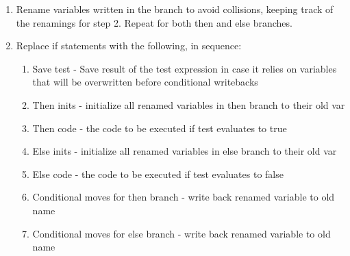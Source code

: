 \documentclass[sigplan, review]{acmart}
\begin{document}
\begin{enumerate}
   \item Rename variables written in the branch to avoid collisions, keeping track of the renamings for step 2. Repeat for both then and else branches.
   \item Replace if statements with the following, in sequence:
   \begin{enumerate}
       \item Save test - Save result of the test expression in case it relies on variables that will be overwritten before conditional writebacks
       \item Then inits - initialize all renamed variables in then branch to their old var
       \item Then code - the code to be executed if test evaluates to true
       \item Else inits - initialize all renamed variables in else branch to their old var
       \item Else code - the code to be executed if test evaluates to false
       \item Conditional moves for then branch - write back renamed variable to old name
       \item Conditional moves for else branch - write back renamed variable to old name
   \end{enumerate}
\end{enumerate}
\end{document}
